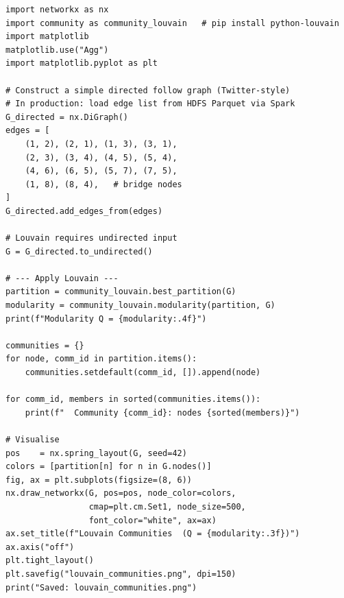 \begin{lstlisting}[style=pyspark, caption={Community detection with Louvain
  in Python (networkx + python-louvain)}]
import networkx as nx
import community as community_louvain   # pip install python-louvain
import matplotlib
matplotlib.use("Agg")
import matplotlib.pyplot as plt

# Construct a simple directed follow graph (Twitter-style)
# In production: load edge list from HDFS Parquet via Spark
G_directed = nx.DiGraph()
edges = [
    (1, 2), (2, 1), (1, 3), (3, 1),
    (2, 3), (3, 4), (4, 5), (5, 4),
    (4, 6), (6, 5), (5, 7), (7, 5),
    (1, 8), (8, 4),   # bridge nodes
]
G_directed.add_edges_from(edges)

# Louvain requires undirected input
G = G_directed.to_undirected()

# --- Apply Louvain ---
partition = community_louvain.best_partition(G)
modularity = community_louvain.modularity(partition, G)
print(f"Modularity Q = {modularity:.4f}")

communities = {}
for node, comm_id in partition.items():
    communities.setdefault(comm_id, []).append(node)

for comm_id, members in sorted(communities.items()):
    print(f"  Community {comm_id}: nodes {sorted(members)}")

# Visualise
pos    = nx.spring_layout(G, seed=42)
colors = [partition[n] for n in G.nodes()]
fig, ax = plt.subplots(figsize=(8, 6))
nx.draw_networkx(G, pos=pos, node_color=colors,
                 cmap=plt.cm.Set1, node_size=500,
                 font_color="white", ax=ax)
ax.set_title(f"Louvain Communities  (Q = {modularity:.3f})")
ax.axis("off")
plt.tight_layout()
plt.savefig("louvain_communities.png", dpi=150)
print("Saved: louvain_communities.png")
\end{lstlisting}

